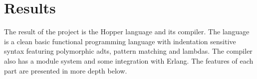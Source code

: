 \chapter{Results}

The result of the project is the Hopper language and its compiler. The language is a clean basic functional programming language with indentation sensitive syntax featuring polymorphic \glspl{adt}, pattern matching and lambdas. The compiler also has a module system and some integration with Erlang. The features of each part are presented in more depth below. 



